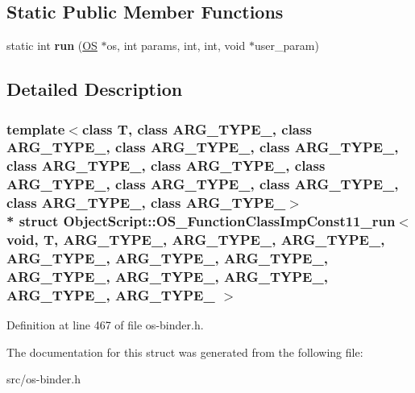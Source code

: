\subsection*{Static Public Member Functions}
\begin{DoxyCompactItemize}
\item 
static int {\bfseries run} (\hyperlink{class_object_script_1_1_o_s}{OS} $\ast$os, int params, int, int, void $\ast$user\+\_\+param)\hypertarget{struct_object_script_1_1_o_s___function_class_imp_const11__run_3_01void_00_01_t_00_01_01_01_a_r_c2f9e5179d6c780dc879adac9c51681d_ac36b3cff74c6d45c7d6c8b20a31c3cf9}{}\label{struct_object_script_1_1_o_s___function_class_imp_const11__run_3_01void_00_01_t_00_01_01_01_a_r_c2f9e5179d6c780dc879adac9c51681d_ac36b3cff74c6d45c7d6c8b20a31c3cf9}

\end{DoxyCompactItemize}


\subsection{Detailed Description}
\subsubsection*{template$<$class T, class A\+R\+G\+\_\+\+T\+Y\+P\+E\+\_, class A\+R\+G\+\_\+\+T\+Y\+P\+E\+\_, class A\+R\+G\+\_\+\+T\+Y\+P\+E\+\_, class A\+R\+G\+\_\+\+T\+Y\+P\+E\+\_, class A\+R\+G\+\_\+\+T\+Y\+P\+E\+\_, class A\+R\+G\+\_\+\+T\+Y\+P\+E\+\_, class A\+R\+G\+\_\+\+T\+Y\+P\+E\+\_, class A\+R\+G\+\_\+\+T\+Y\+P\+E\+\_, class A\+R\+G\+\_\+\+T\+Y\+P\+E\+\_, class A\+R\+G\+\_\+\+T\+Y\+P\+E\+\_, class A\+R\+G\+\_\+\+T\+Y\+P\+E\+\_$>$\\*
struct Object\+Script\+::\+O\+S\+\_\+\+Function\+Class\+Imp\+Const11\+\_\+run$<$ void, T,   A\+R\+G\+\_\+\+T\+Y\+P\+E\+\_, A\+R\+G\+\_\+\+T\+Y\+P\+E\+\_, A\+R\+G\+\_\+\+T\+Y\+P\+E\+\_, A\+R\+G\+\_\+\+T\+Y\+P\+E\+\_, A\+R\+G\+\_\+\+T\+Y\+P\+E\+\_, A\+R\+G\+\_\+\+T\+Y\+P\+E\+\_, A\+R\+G\+\_\+\+T\+Y\+P\+E\+\_, A\+R\+G\+\_\+\+T\+Y\+P\+E\+\_, A\+R\+G\+\_\+\+T\+Y\+P\+E\+\_, A\+R\+G\+\_\+\+T\+Y\+P\+E\+\_, A\+R\+G\+\_\+\+T\+Y\+P\+E\+\_ $>$}



Definition at line 467 of file os-\/binder.\+h.



The documentation for this struct was generated from the following file\+:\begin{DoxyCompactItemize}
\item 
src/os-\/binder.\+h\end{DoxyCompactItemize}
